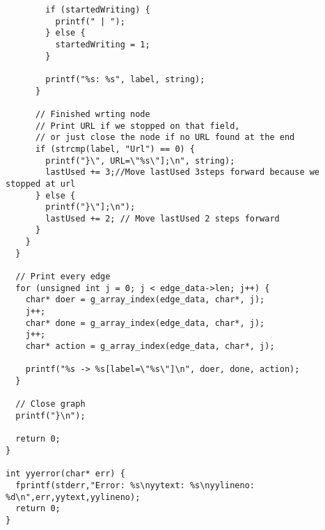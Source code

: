 \documentclass[a4paper]{article}
\begin{document}
\begin{lstlisting}
        if (startedWriting) {
          printf(" | ");
        } else {
          startedWriting = 1;
        }

        printf("%s: %s", label, string);
      }

      // Finished wrting node
      // Print URL if we stopped on that field,
      // or just close the node if no URL found at the end
      if (strcmp(label, "Url") == 0) {
        printf("}\", URL=\"%s\"];\n", string);
        lastUsed += 3;//Move lastUsed 3steps forward because we stopped at url
      } else {
        printf("}\"];\n");
        lastUsed += 2; // Move lastUsed 2 steps forward
      }
    }
  }

  // Print every edge
  for (unsigned int j = 0; j < edge_data->len; j++) {
    char* doer = g_array_index(edge_data, char*, j);
    j++;
    char* done = g_array_index(edge_data, char*, j);
    j++;
    char* action = g_array_index(edge_data, char*, j);

    printf("%s -> %s[label=\"%s\"]\n", doer, done, action);
  }

  // Close graph
  printf("}\n");

  return 0;
}

int yyerror(char* err) {
  fprintf(stderr,"Error: %s\nyytext: %s\nyylineno: %d\n",err,yytext,yylineno);
  return 0;
}

\end{lstlisting} 


\pagebreak
\printbibliography
\end{document}
